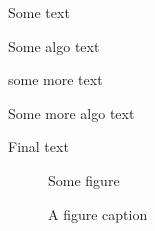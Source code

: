 \documentclass{article}
\begin{document}
Some text
\begin{algorithm}[tbp]
\caption{Euclid’s algorithm}\label{alg:euclid}
Some algo text
\end{algorithm}
some more text
\begin{algorithm}[H]
\caption{blub}
Some more algo text
\end{algorithm}
Final text
\begin{figure}
\caption{A figure caption}
Some figure
\end{figure}
\listofalgorithms
\end{document}

